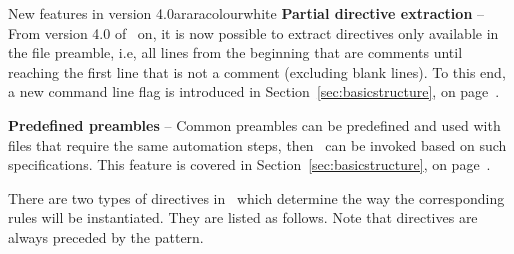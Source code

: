 \begin{messagebox}{New features in version 4.0}{araracolour}{\icinfo}{white}
\setlength{\parskip}{1em}
\textbf{Partial directive extraction} -- From version 4.0 of \arara\ on, it is now possible to extract directives only available in the file preamble, i.e, all lines from the beginning that are comments until reaching the first line that is not a comment (excluding blank lines). To this end, a new command line flag is introduced in Section~\ref{sec:basicstructure}, on page~\pageref{sec:basicstructure}.

\textbf{Predefined preambles} -- Common preambles can be predefined and used with files that require the same automation steps, then \arara\ can be invoked based on such specifications. This feature is covered in Section~\ref{sec:basicstructure}, on page~\pageref{sec:basicstructure}.
\end{messagebox}


There are two types of directives in \arara\ which determine the way the corresponding rules will be instantiated. They are listed as follows. Note that directives are always preceded by the  pattern.

